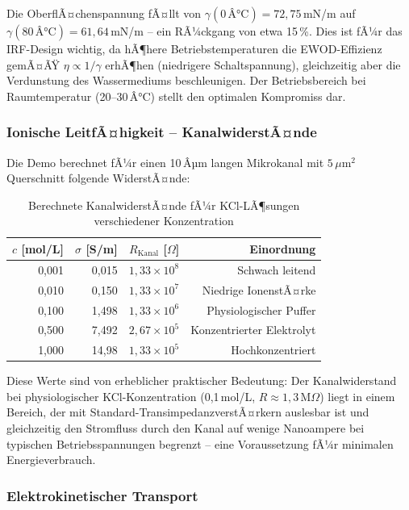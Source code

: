 ﻿\documentclass[a4paper,12pt]{scrreprt}
\theoremstyle{definition}
\begin{document}
Die OberflÃ¤chenspannung fÃ¤llt von $\gamma(0\,Â°\text{C}) = 72{,}75$\,mN/m auf
$\gamma(80\,Â°\text{C}) = 61{,}64$\,mN/m -- ein RÃ¼ckgang von etwa 15\,\%.
Dies ist fÃ¼r das IRF-Design wichtig, da hÃ¶here Betriebstemperaturen die
EWOD-Effizienz gemÃ¤ÃŸ $\eta \propto 1/\gamma$ erhÃ¶hen (niedrigere Schaltspannung),
gleichzeitig aber die Verdunstung des Wassermediums beschleunigen. Der
Betriebsbereich bei Raumtemperatur (20--30\,Â°C) stellt den optimalen
Kompromiss dar.

\subsubsection{Ionische LeitfÃ¤higkeit -- KanalwiderstÃ¤nde}

Die Demo berechnet fÃ¼r einen 10\,Âµm langen Mikrokanal mit $5\,\mu\text{m}^2$
Querschnitt folgende WiderstÃ¤nde:

\begin{table}[H]
	\centering
	\caption{Berechnete KanalwiderstÃ¤nde fÃ¼r KCl-LÃ¶sungen verschiedener Konzentration}
	\label{tab:kanalwiderstand}
	\begin{tabular}{rrrr}
		\toprule
		$c$ [mol/L] & $\sigma$ [S/m] & $R_\text{Kanal}$ [$\Omega$] & Einordnung \\
		\midrule
		0,001 & 0,015 & $1{,}33 \times 10^{8}$ & Schwach leitend \\
		0,010 & 0,150 & $1{,}33 \times 10^{7}$ & Niedrige IonenstÃ¤rke \\
		0,100 & 1,498 & $1{,}33 \times 10^{6}$ & Physiologischer Puffer \\
		0,500 & 7,492 & $2{,}67 \times 10^{5}$ & Konzentrierter Elektrolyt \\
		1,000 & 14,98 & $1{,}33 \times 10^{5}$ & Hochkonzentriert \\
		\bottomrule
	\end{tabular}
\end{table}

Diese Werte sind von erheblicher praktischer Bedeutung: Der Kanalwiderstand
bei physiologischer KCl-Konzentration (0,1\,mol/L, $R \approx 1{,}3$\,M$\Omega$)
liegt in einem Bereich, der mit Standard-TransimpedanzverstÃ¤rkern auslesbar
ist und gleichzeitig den Stromfluss durch den Kanal auf wenige Nanoampere
bei typischen Betriebsspannungen begrenzt -- eine Voraussetzung fÃ¼r minimalen
Energieverbrauch.

\subsubsection{Elektrokinetischer Transport}
\end{document}
